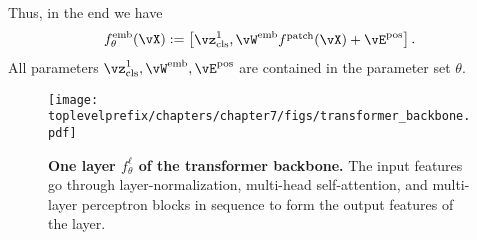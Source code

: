\documentclass[../../book-main.tex]{subfiles}
\begin{document}
Thus, in the end we have 
\begin{equation}\label{eq:definition_of_embedding_module}
    f_{\theta}^{\emb}(\vX) := \mat{\vz_{\cls}^{1}, \vW^{\emb}f^{\patch}(\vX) + \vE^{\pos}}.
\end{equation}
All parameters \(\vz_{\cls}^{1}, \vW^{\emb}, \vE^{\pos}\) are contained in the parameter set \(\theta\).

\begin{figure}
    \centering 
    \texttt{[image: \\toplevelprefix/chapters/chapter7/figs/transformer\_backbone.pdf]}
    \caption{\small\textbf{One layer \(f_{\theta}^{\ell}\) of the transformer backbone.} The input features go through layer-normalization, multi-head self-attention, and multi-layer perceptron blocks in sequence to form the output features of the layer.}
    \label{fig:transformer_backbone}
\end{figure}
\end{document}
